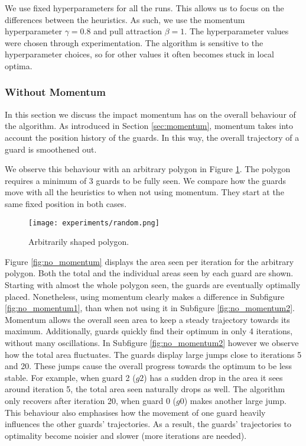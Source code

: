 We  use fixed hyperparameters for all the runs. This allows us to focus on the differences between the heuristics. 
As such, we  use the momentum hyperparameter $\gamma = 0.8$ and pull attraction $\beta = 1$. The hyperparameter values were chosen through experimentation. The algorithm is sensitive to the hyperparameter choices, so for other values it often becomes stuck in local optima.

\subsubsection{Without Momentum}
In this section we  discuss the impact momentum has on the overall behaviour of the algorithm. As introduced in Section \ref{sec:momentum}, momentum takes into account the position history of the guards. In this way, the overall trajectory of a guard is smoothened out.

We observe this behaviour with an arbitrary polygon in Figure \ref{fig:random}. The polygon requires a minimum of 3 guards to be fully seen. We  compare how the guards move with all the heuristics to when not using momentum. They start at the same fixed position in both cases.

\begin{figure}[h!]
    \centering
    \texttt{[image: experiments/random.png]}
    \caption{Arbitrarily shaped polygon.}
    \label{fig:random}
\end{figure}

\newpage
Figure \ref{fig:no_momentum} displays the area seen per iteration for the arbitrary polygon. Both the total and the individual areas seen by each guard are shown. Starting with almost the whole polygon seen, the guards are eventually optimally placed. Nonetheless, using momentum clearly makes a difference in Subfigure \ref{fig:no_momentum1}, than when not using it in Subfigure \ref{fig:no_momentum2}. Momentum allows the overall seen area to keep a steady trajectory towards its maximum. Additionally, guards quickly find their optimum in only 4 iterations, without many oscillations. In Subfigure \ref{fig:no_momentum2} however we  observe how the total area fluctuates. The guards display large jumps close to iterations 5 and 20. These jumps cause the overall progress towards the optimum to be less stable. For example, when guard 2 ($g2$) has a sudden drop in the area it sees around iteration 5, the total area seen naturally drops as well. The algorithm only recovers after iteration 20, when guard 0 ($g0$) makes another large jump. This behaviour also emphasises how the movement of one guard heavily influences the other guards' trajectories. As a result, the guards' trajectories to optimality become noisier and slower (more iterations are needed).


